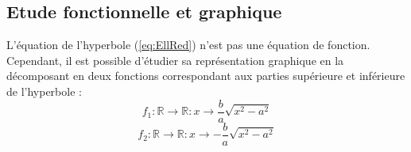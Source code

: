 \newpage

\subsection{Etude fonctionnelle et graphique}\label{section:hypgraphe}


L'équation de l'hyperbole (\ref{eq:EllRed}) n'est pas une équation de fonction.\\
Cependant, il est possible d’étudier sa représentation graphique en la décomposant en deux fonctions correspondant aux parties supérieure et inférieure de l'hyperbole :\\
\[f_1 : \mathbb{R} \rightarrow\mathbb{R} : x \rightarrow \dfrac{b}{a}\sqrt{x^2-a^2} \]
\[f_2 : \mathbb{R} \rightarrow\mathbb{R} : x \rightarrow -\dfrac{b}{a}\sqrt{x^2-a^2} \]

